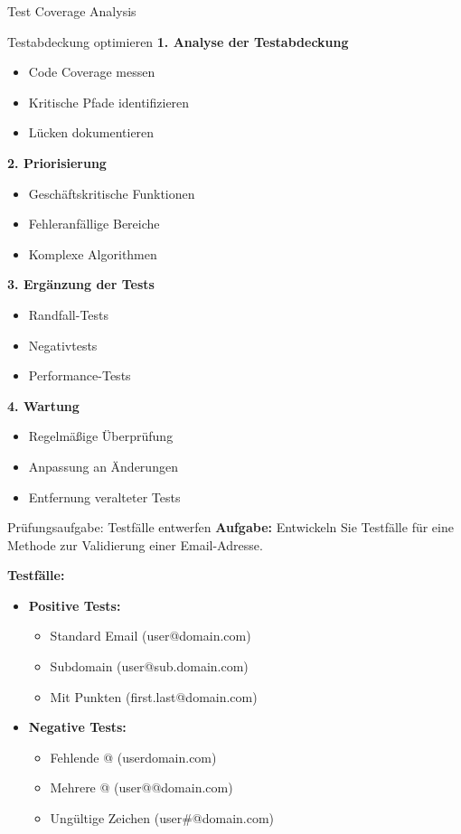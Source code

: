 \begin{example2}{Test Coverage Analysis}
\begin{KR}{Testabdeckung optimieren}
\textbf{1. Analyse der Testabdeckung}
\begin{itemize}
    \item Code Coverage messen
    \item Kritische Pfade identifizieren
    \item Lücken dokumentieren
\end{itemize}

\textbf{2. Priorisierung}
\begin{itemize}
    \item Geschäftskritische Funktionen
    \item Fehleranfällige Bereiche
    \item Komplexe Algorithmen
\end{itemize}

\textbf{3. Ergänzung der Tests}
\begin{itemize}
    \item Randfall-Tests
    \item Negativtests
    \item Performance-Tests
\end{itemize}

\textbf{4. Wartung}
\begin{itemize}
    \item Regelmäßige Überprüfung
    \item Anpassung an Änderungen
    \item Entfernung veralteter Tests
\end{itemize}
\end{KR}

\begin{example2}{Prüfungsaufgabe: Testfälle entwerfen}
\textbf{Aufgabe:}
Entwickeln Sie Testfälle für eine Methode zur Validierung einer Email-Adresse.

\textbf{Testfälle:}
\begin{itemize}
    \item \textbf{Positive Tests:}
    \begin{itemize}
        \item Standard Email (user@domain.com)
        \item Subdomain (user@sub.domain.com)
        \item Mit Punkten (first.last@domain.com)
    \end{itemize}
    
    \item \textbf{Negative Tests:}
    \begin{itemize}
        \item Fehlende @ (userdomain.com)
        \item Mehrere @ (user@@domain.com)
        \item Ungültige Zeichen (user\#@domain.com)
    \end{itemize}
    

\end{itemize}
\end{example2}
\end{example2}
